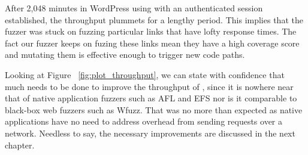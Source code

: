 After 2,048 minutes in WordPress using \pname{} with an authenticated session established, the throughput plummets for a lengthy period. This implies that the fuzzer was stuck on fuzzing particular links that have lofty response times. The fact our fuzzer keeps on fuzing these links mean they have a high coverage score and mutating them is effective enough to trigger new code paths.

Looking at Figure ~\ref{fig:plot_throughput}, we can state with confidence that much needs to be done to improve the throughput of \pname{}, since it is nowhere near that of native application fuzzers such as AFL and EFS nor is it comparable to black-box web fuzzers such as Wfuzz. That was no more than expected as native applications have no need to address overhead from sending requests over a network. Needless to say, the necessary improvements are discussed in the next chapter.